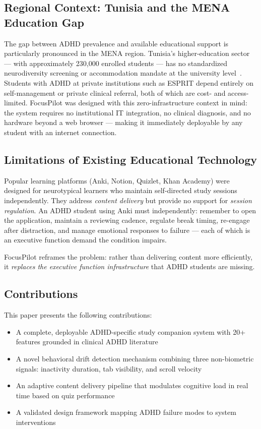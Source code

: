 \documentclass[conference]{IEEEtran}
\begin{document}
\subsection{Regional Context: Tunisia and the MENA Education Gap}

The gap between ADHD prevalence and available educational support is particularly pronounced in the MENA region. Tunisia's higher-education sector — with approximately 230{,}000 enrolled students — has no standardized neurodiversity screening or accommodation mandate at the university level~\cite{mhesrTunisia2023}. Students with ADHD at private institutions such as ESPRIT depend entirely on self-management or private clinical referral, both of which are cost- and access-limited. FocusPilot was designed with this zero-infrastructure context in mind: the system requires no institutional IT integration, no clinical diagnosis, and no hardware beyond a web browser — making it immediately deployable by any student with an internet connection.

\subsection{Limitations of Existing Educational Technology}

Popular learning platforms (Anki, Notion, Quizlet, Khan Academy) were designed for neurotypical learners who maintain self-directed study sessions independently. They address \emph{content delivery} but provide no support for \emph{session regulation}. An ADHD student using Anki must independently: remember to open the application, maintain a reviewing cadence, regulate break timing, re-engage after distraction, and manage emotional responses to failure — each of which is an executive function demand the condition impairs.

FocusPilot reframes the problem: rather than delivering content more efficiently, it \emph{replaces the executive function infrastructure} that ADHD students are missing.

\subsection{Contributions}

This paper presents the following contributions:
\begin{itemize}
  \item A complete, deployable ADHD-specific study companion system with 20+ features grounded in clinical ADHD literature
  \item A novel behavioral drift detection mechanism combining three non-biometric signals: inactivity duration, tab visibility, and scroll velocity
  \item An adaptive content delivery pipeline that modulates cognitive load in real time based on quiz performance
  \item A validated design framework mapping ADHD failure modes to system interventions
\end{itemize}
\end{document}
